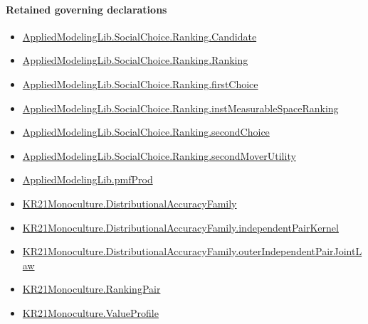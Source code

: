 \documentclass[10pt]{article}
\begin{document}
\paragraph{Retained governing declarations}
\begin{itemize}\raggedright
\item \hyperlink{library-prerequisite-8c0e6c25845ae78a}{Applied\allowbreak{}Modeling\allowbreak{}Lib.\allowbreak{}Social\allowbreak{}Choice.\allowbreak{}Ranking.\allowbreak{}Candidate}
\item \hyperlink{library-prerequisite-5cde54446d1ae021}{Applied\allowbreak{}Modeling\allowbreak{}Lib.\allowbreak{}Social\allowbreak{}Choice.\allowbreak{}Ranking.\allowbreak{}Ranking}
\item \hyperlink{governing-declaration-08e457479ee6cf15}{Applied\allowbreak{}Modeling\allowbreak{}Lib.\allowbreak{}Social\allowbreak{}Choice.\allowbreak{}Ranking.\allowbreak{}first\allowbreak{}Choice}
\item \hyperlink{governing-declaration-30ca9c740ef703ec}{Applied\allowbreak{}Modeling\allowbreak{}Lib.\allowbreak{}Social\allowbreak{}Choice.\allowbreak{}Ranking.\allowbreak{}inst\allowbreak{}Measurable\allowbreak{}Space\allowbreak{}Ranking}
\item \hyperlink{governing-declaration-25ac37baf58f31e2}{Applied\allowbreak{}Modeling\allowbreak{}Lib.\allowbreak{}Social\allowbreak{}Choice.\allowbreak{}Ranking.\allowbreak{}second\allowbreak{}Choice}
\item \hyperlink{library-prerequisite-21bd2a45ab961ae4}{Applied\allowbreak{}Modeling\allowbreak{}Lib.\allowbreak{}Social\allowbreak{}Choice.\allowbreak{}Ranking.\allowbreak{}second\allowbreak{}Mover\allowbreak{}Utility}
\item \hyperlink{governing-declaration-de8e2a8bfe221a38}{Applied\allowbreak{}Modeling\allowbreak{}Lib.\allowbreak{}pmf\allowbreak{}Prod}
\item \hyperlink{paper-prerequisite-ee564fa2921e1add}{KR21\allowbreak{}Monoculture.\allowbreak{}Distributional\allowbreak{}Accuracy\allowbreak{}Family}
\item \hyperlink{governing-declaration-6707a8f10749a28d}{KR21\allowbreak{}Monoculture.\allowbreak{}Distributional\allowbreak{}Accuracy\allowbreak{}Family.\allowbreak{}independent\allowbreak{}Pair\allowbreak{}Kernel}
\item \hyperlink{governing-declaration-e6c9a24a5d927c25}{KR21\allowbreak{}Monoculture.\allowbreak{}Distributional\allowbreak{}Accuracy\allowbreak{}Family.\allowbreak{}outer\allowbreak{}Independent\allowbreak{}Pair\allowbreak{}Joint\allowbreak{}Law}
\item \hyperlink{governing-declaration-90a7e19d973f51cb}{KR21\allowbreak{}Monoculture.\allowbreak{}Ranking\allowbreak{}Pair}
\item \hyperlink{paper-prerequisite-c0e41e9b0e843969}{KR21\allowbreak{}Monoculture.\allowbreak{}Value\allowbreak{}Profile}
\end{itemize}
\end{document}
